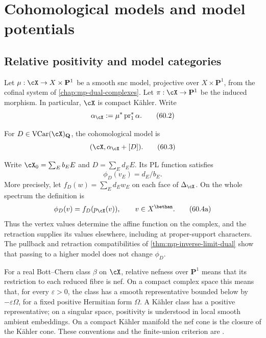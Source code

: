 \section{Cohomological models and model potentials}
\label{sec:mp-psh-models}
\subsection{Relative positivity and model categories}
\label{subsec:mp-psh-relative-positivity}



Let $\mu:\cX\to X\times\mathbf P^1$ be a smooth snc model,
projective over $X\times\mathbf P^1$, from the cofinal system
of \cref{chap:mp-dual-complexes}. Let
$\pi:\cX\to\mathbf P^1$ be the induced morphism.
In particular, $\cX$ is compact K\"ahler. Write
\[
          \alpha_{\cX}:=\mu^*\operatorname{pr}_1^*\alpha.
\tag{60.2}\label{eq:mp-pulled-class}
\]
\noindent\begin{minipage}{\linewidth}
For $D\in\operatorname{VCar}(\cX)_{\mathbf Q}$, the cohomological model is
\[
                         (\cX,\alpha_{\cX}+[D]).
\tag{60.3}\label{eq:mp-cohomological-model}
\]
\end{minipage}
\par
Write $\cX_0=\sum_E b_EE$ and
$D=\sum_E d_EE$. Its PL function satisfies
\[
                     \phi_D(v_E)=d_E/b_E.
\tag{60.4}\label{eq:mp-divisor-potential}
\]
More precisely, let $f_D(w)=\sum_E d_Ew_E$ on each face of
$\Delta_{\cX}$. On the whole spectrum the definition is
\[
                 \phi_D(v)=f_D(p_{\cX}(v)),
                 \qquad v\in X^{\bethan}.
\tag{60.4a}\label{eq:mp-model-potential-retraction}
\]
Thus the vertex values determine the affine function on the
complex, and the retraction supplies its values elsewhere,
including at proper-support characters. The pullback and
retraction compatibilities of \cref{thm:mp-inverse-limit-dual}
show that passing to a higher model does not change $\phi_D$.

For a real Bott--Chern class $\beta$ on $\cX$, relative nefness
over $\mathbf P^1$ means that its restriction to each reduced
fibre is nef. On a compact complex space this means that, for
every $\varepsilon>0$, the class has a smooth representative
bounded below by $-\varepsilon\Omega$, for a fixed positive
Hermitian form $\Omega$. A K\"ahler class has a positive
representative; on a singular space, positivity is understood
in local smooth ambient embeddings. On a compact K\"ahler
manifold the nef cone is the closure of the K\"ahler cone.
These conventions and the finite-union criterion are
\cite[Proposition~3.3(ii) and the following paragraph,
pp.~1262--1263]{DP04}.

